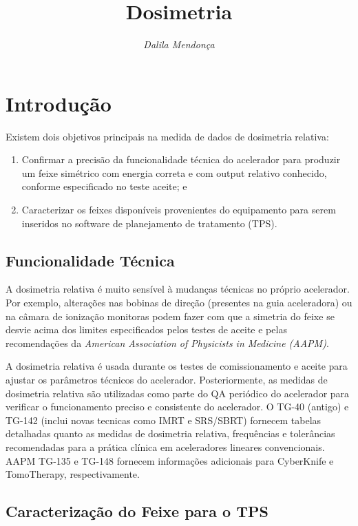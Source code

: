\documentclass[11pt,a4paper]{article}
\title{\LobsterTwo\Huge{Dosimetria}}
\author{\LobsterTwo{Dosimetria Relativa}\nocite{*}}
\date{\LobsterTwo\textit{Dalila Mendonça}}
\newcounter{exemplo}
\begin{document}
	\maketitle


\section{Introdução}

	Existem dois objetivos principais na medida de dados de dosimetria relativa:
	
	\begin{enumerate}
		\item Confirmar a precisão da funcionalidade técnica do acelerador para produzir um feixe simétrico com energia correta e com output relativo conhecido, conforme especificado no teste aceite; e
		\item Caracterizar os feixes disponíveis provenientes do equipamento para serem inseridos no software de planejamento de tratamento (TPS).
	\end{enumerate}
	
\subsection*{Funcionalidade Técnica}

	A dosimetria relativa é muito sensível à mudanças técnicas no próprio acelerador. Por exemplo, alterações nas bobinas de direção (presentes na guia aceleradora) ou na câmara de ionização monitoras podem fazer com que a simetria do feixe se desvie acima dos limites especificados pelos testes de aceite e pelas recomendações da \textit{American Association of Physicists in Medicine (AAPM)}.

	A dosimetria relativa é usada durante os testes de comissionamento e aceite para ajustar os parâmetros técnicos do acelerador. Posteriormente, as medidas de dosimetria relativa são utilizadas como parte do QA periódico do acelerador para verificar o funcionamento preciso e consistente do acelerador. O TG-40 (antigo) e TG-142 (inclui novas tecnicas como IMRT e SRS/SBRT) fornecem tabelas detalhadas quanto as medidas de dosimetria relativa, frequências e tolerâncias recomendadas para a prática clínica em aceleradores lineares convencionais. AAPM TG-135 e TG-148 fornecem informações adicionais para CyberKnife e TomoTherapy, respectivamente.

\subsection{Caracterização do Feixe para o TPS}
\end{document}
